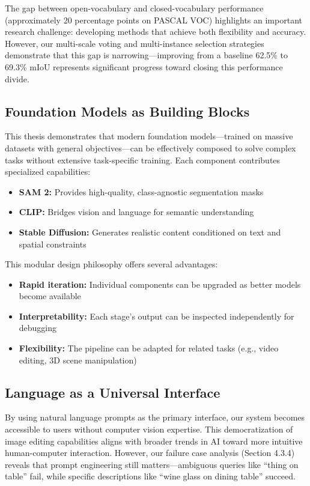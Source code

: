 The gap between open-vocabulary and closed-vocabulary performance (approximately 20 percentage points on PASCAL VOC) highlights an important research challenge: developing methods that achieve both flexibility and accuracy. However, our multi-scale voting and multi-instance selection strategies demonstrate that this gap is narrowing—improving from a baseline 62.5\% to 69.3\% mIoU represents significant progress toward closing this performance divide.

\subsection{Foundation Models as Building Blocks}

This thesis demonstrates that modern foundation models—trained on massive datasets with general objectives—can be effectively composed to solve complex tasks without extensive task-specific training. Each component contributes specialized capabilities:

\begin{itemize}
    \item \textbf{SAM 2:} Provides high-quality, class-agnostic segmentation masks
    \item \textbf{CLIP:} Bridges vision and language for semantic understanding
    \item \textbf{Stable Diffusion:} Generates realistic content conditioned on text and spatial constraints
\end{itemize}

This modular design philosophy offers several advantages:
\begin{itemize}
    \item \textbf{Rapid iteration:} Individual components can be upgraded as better models become available
    \item \textbf{Interpretability:} Each stage's output can be inspected independently for debugging
    \item \textbf{Flexibility:} The pipeline can be adapted for related tasks (e.g., video editing, 3D scene manipulation)
\end{itemize}

\subsection{Language as a Universal Interface}

By using natural language prompts as the primary interface, our system becomes accessible to users without computer vision expertise. This democratization of image editing capabilities aligns with broader trends in AI toward more intuitive human-computer interaction. However, our failure case analysis (Section 4.3.4) reveals that prompt engineering still matters—ambiguous queries like ``thing on table'' fail, while specific descriptions like ``wine glass on dining table'' succeed.

